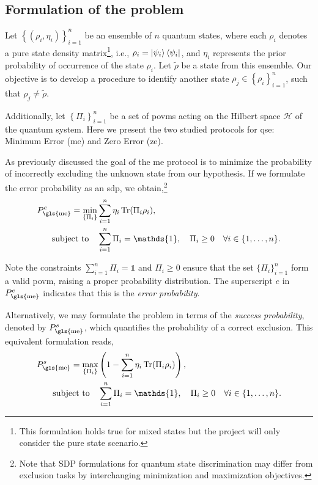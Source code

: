 \documentclass[12pt,letterpaper]{article}
\DeclareMathOperator{\tr}{Tr}
\begin{document}
\subsection{Formulation of the problem}\label{sectionFormulationOfTheProblem}

\hspace{20pt}Let $\left\{(\rho_i, \eta_i)\right\}_{i=1}^n$ be an ensemble of $n$ quantum states, where each $\rho_i$ denotes a pure state density matrix\footnote{This formulation holds true for mixed states but the project will only consider the pure state scenario.}, i.e., $\rho_i = \ket{\psi_i}\bra{\psi_i}$, and $\eta_i$ represents the prior probability of occurrence of the state $\rho_i$. Let $\tilde{\rho}$ be a state from this ensemble. Our objective is to develop a procedure to identify another state $\rho_j \in \left\{\rho_i\right\}_{i=1}^n$, such that $\rho_j \neq \tilde{\rho}$.

Additionally, let $\left\{\Pi_i\right\}_{i=1}^n$ be a set of \glspl{povm} acting on the Hilbert space $\mathcal{H}$ of the quantum system. Here we present the two studied protocols for \gls{qse}: Minimum Error (\gls{me}) and Zero Error (\gls{ze}).

As previously discussed the goal of the \gls{me} protocol is to minimize the probability of incorrectly excluding the unknown state from our hypothesis. If we formulate the error probability as an \gls{sdp}, we obtain,\footnote{Note that SDP formulations for quantum state discrimination may differ from exclusion tasks by interchanging minimization and maximization objectives.}
\begin{align*}
	P_{\text{\gls{me}}}^e = \min_{\left\{\Pi_i\right\}} &\sum_{i=1}^n \eta_i \tr(\Pi_i \rho_i),\\
	\text{subject to} \quad & \sum_{i=1}^n \Pi_i = \mathds{1}, \quad \Pi_i \geq 0 \quad \forall i \in \{1, \dots, n\}.
\end{align*}

Note the constraints $\sum_{i=1}^n \Pi_i = \mathds{1}$ and $\Pi_i \geq 0$ ensure that the set $\{\Pi_i\}_{i=1}^n$ form a valid \gls{povm}, raising a proper probability distribution. The superscript $e$ in $P_{\text{\gls{me}}}^e$ indicates that this is the \emph{error probability}.

Alternatively, we may formulate the problem in terms of the \emph{success probability}, denoted by $P_{\text{\gls{me}}}^s$, which quantifies the probability of a correct exclusion. This equivalent formulation reads,
\begin{align*}
	P_{\text{\gls{me}}}^s = \max_{\left\{\Pi_i\right\}} &\left(1 - \sum_{i=1}^n \eta_i\tr(\Pi_i \rho_i)\right),\\
	\text{subject to} \quad & \sum_{i=1}^n \Pi_i = \mathds{1}, \quad \Pi_i \geq 0 \quad \forall i \in \{1, \dots, n\}.
\end{align*}
\end{document}

